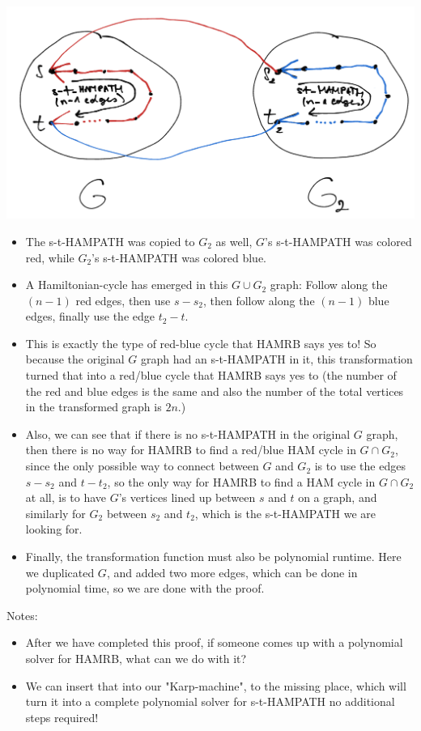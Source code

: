 \begin{center}
\includegraphics[width=0.9\linewidth]{./exams/2022_05_30/03/karp_where.png}
\end{center}

\begin{itemize}
    \item The s-t-HAMPATH was copied to $G_2$ as well, $G$'s s-t-HAMPATH was colored red, while $G_2$'s s-t-HAMPATH was colored blue.
    \item A Hamiltonian-cycle has emerged in this $G\cup{}G_2$ graph: Follow along the $(n-1)$ red edges, then use $s-s_2$, then follow along the $(n-1)$ blue edges, finally use the edge $t_2-t$.
    \item This is exactly the type of red-blue cycle that HAMRB says yes to! So because the original $G$ graph had an s-t-HAMPATH in it, this transformation turned that into a red/blue cycle that HAMRB says yes to (the number of the red and blue edges is the same and also the number of the total vertices in the transformed graph is $2n$.)
    \item Also, we can see that if there is no s-t-HAMPATH in the original $G$ graph, then there is no way for HAMRB to find a red/blue HAM cycle in $G\cap{}G_2$, since the only possible way to connect between $G$ and $G_2$ is to use the edges $s-s_2$ and $t-t_2$, so the only way for HAMRB to find a HAM cycle in $G\cap{}G_2$ at all, is to have $G$'s vertices lined up between $s$ and $t$ on a graph, and similarly for $G_2$ between $s_2$ and $t_2$, which is the s-t-HAMPATH we are looking for.
    \item Finally, the transformation function must also be polynomial runtime. Here we duplicated $G$, and added two more edges, which can be done in polynomial time, so we are done with the proof.
\end{itemize}

Notes:
\begin{itemize}
    \item After we have completed this proof, if someone comes up with a polynomial solver for HAMRB, what can we do with it?
    \item We can insert that into our "Karp-machine", to the missing place, which will turn it into a complete polynomial solver for s-t-HAMPATH no additional steps required!
\end{itemize}

